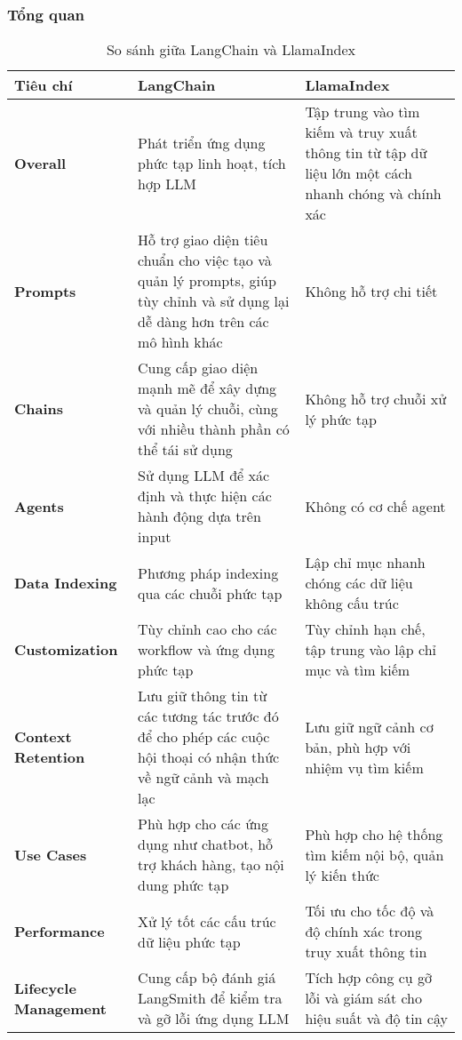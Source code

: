 \subsubsection{Tổng quan}
\begin{table}[H]
\centering
\begin{tabular}{|p{3.5cm}|p{6cm}|p{6cm}|}
\hline
\textbf{Tiêu chí} & \textbf{LangChain} & \textbf{LlamaIndex} \\ \hline
\textbf{Overall} & Phát triển ứng dụng phức tạp linh hoạt, tích hợp LLM & Tập trung vào tìm kiếm và truy xuất thông tin từ tập dữ liệu lớn một cách nhanh chóng và chính xác \\ \hline
\textbf{Prompts} & Hỗ trợ giao diện tiêu chuẩn cho việc tạo và quản lý prompts, giúp tùy chỉnh và sử dụng lại dễ dàng hơn trên các mô hình khác & Không hỗ trợ chi tiết \\ \hline
\textbf{Chains} & Cung cấp giao diện mạnh mẽ để xây dựng và quản lý chuỗi, cùng với nhiều thành phần có thể tái sử dụng & Không hỗ trợ chuỗi xử lý phức tạp \\ \hline
\textbf{Agents} & Sử dụng LLM để xác định và thực hiện các hành động dựa trên input & Không có cơ chế agent \\ \hline
\textbf{Data Indexing} & Phương pháp indexing qua các chuỗi phức tạp & Lập chỉ mục nhanh chóng các dữ liệu không cấu trúc \\ \hline
\textbf{Customization} & Tùy chỉnh cao cho các workflow và ứng dụng phức tạp & Tùy chỉnh hạn chế, tập trung vào lập chỉ mục và tìm kiếm \\ \hline
\textbf{Context Retention} & Lưu giữ thông tin từ các tương tác trước đó để cho phép các cuộc hội thoại có nhận thức về ngữ cảnh và mạch lạc & Lưu giữ ngữ cảnh cơ bản, phù hợp với nhiệm vụ tìm kiếm \\ \hline
\textbf{Use Cases} & Phù hợp cho các ứng dụng như chatbot, hỗ trợ khách hàng, tạo nội dung phức tạp & Phù hợp cho hệ thống tìm kiếm nội bộ, quản lý kiến thức \\ \hline
\textbf{Performance} & Xử lý tốt các cấu trúc dữ liệu phức tạp & Tối ưu cho tốc độ và độ chính xác trong truy xuất thông tin \\ \hline
\textbf{Lifecycle Management} & Cung cấp bộ đánh giá LangSmith để kiểm tra và gỡ lỗi ứng dụng LLM & Tích hợp công cụ gỡ lỗi và giám sát cho hiệu suất và độ tin cậy \\ \hline
\end{tabular}
\caption{So sánh giữa LangChain và LlamaIndex}
\end{table}

